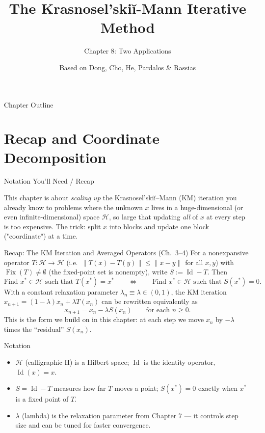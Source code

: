 \documentclass[aspectratio=169,10pt]{beamer}
\title[KM Method -- Ch.8]{The Krasnosel'ski\u{i}-Mann Iterative Method}
\subtitle{Chapter 8: Two Applications}
\author{Based on Dong, Cho, He, Pardalos \& Rassias}
\date{}
\newcommand{\Hsp}{\mathcal H}
\newcommand{\Fix}{\operatorname{Fix}}
\newcommand{\Id}{\operatorname{Id}}
\newcommand{\norm}[1]{\lVert #1 \rVert}
\begin{document}
\begin{frame}
  \titlepage
\end{frame}

\begin{frame}{Chapter Outline}
  \tableofcontents
\end{frame}

\section{Recap and Coordinate Decomposition}

\begin{frame}[allowframebreaks]{Notation You'll Need / Recap}

This chapter is about \emph{scaling up} the Krasnosel'ski\u{i}--Mann (KM) iteration you already know to problems where the unknown $x$ lives in a huge-dimensional (or even infinite-dimensional) space $\Hsp$, so large that updating \emph{all} of $x$ at every step is too expensive. The trick: split $x$ into blocks and update one block ("coordinate") at a time.

\begin{block}{Recap: The KM Iteration and Averaged Operators (Ch.~3--4)}
For a nonexpansive operator $T:\Hsp\to\Hsp$ (i.e.\ $\norm{T(x)-T(y)}\le \norm{x-y}$ for all $x,y$) with $\Fix(T)\neq\emptyset$ (the fixed-point set is nonempty), write $S := \Id - T$. Then
\[
  \text{Find } x^*\in\Hsp \text{ such that } T(x^*)=x^* \qquad\Longleftrightarrow\qquad \text{Find } x^*\in\Hsp \text{ such that } S(x^*)=0.
\]
With a constant relaxation parameter $\lambda_n\equiv\lambda\in(0,1)$, the KM iteration $x_{n+1}=(1-\lambda)x_n+\lambda T(x_n)$ can be rewritten equivalently as
\[
  x_{n+1} = x_n - \lambda S(x_n) \qquad \text{for each } n\ge 0.
\]
This is the form we build on in this chapter: at each step we move $x_n$ by $-\lambda$ times the ``residual'' $S(x_n)$.
\end{block}

\begin{block}{Notation}
\begin{itemize}
  \item $\Hsp$ (calligraphic H) is a Hilbert space; $\Id$ is the identity operator, $\Id(x)=x$.
  \item $S=\Id-T$ measures how far $T$ moves a point; $S(x^*)=0$ exactly when $x^*$ is a fixed point of $T$.
  \item $\lambda$ (lambda) is the relaxation parameter from Chapter 7 --- it controls step size and can be tuned for faster convergence.
\end{itemize}
\end{block}


\end{frame}
\end{document}
